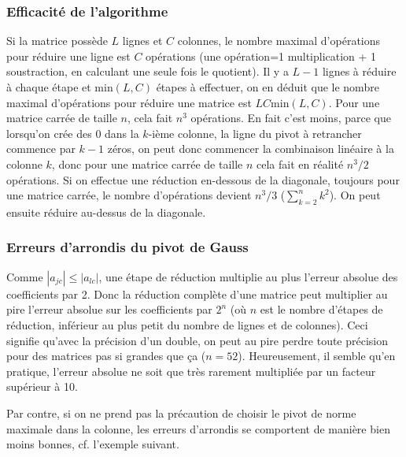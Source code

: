 \documentclass[a4paper,11pt]{article}
\begin{document}
\begin{giacjshere}
\subsubsection{Efficacité de l'algorithme}
Si la matrice possède $L$ lignes et $C$ colonnes,
le nombre maximal d'opérations pour réduire une ligne est 
$C$ op\'erations (une op\'eration=1 multiplication + 1 soustraction, 
en calculant une seule fois le quotient). 
Il y a $L-1$ lignes à réduire à chaque
étape et min$(L,C)$ étapes à effectuer, on en déduit que le
nombre maximal d'opérations pour réduire une matrice est
$LC$min$(L,C)$. Pour une matrice carrée de taille $n$, cela fait 
$n^3$ opérations. En fait c'est moins, parce que lorsqu'on cr\'ee
des 0 dans la $k$-i\`eme colonne, la ligne du pivot \`a retrancher
commence par $k-1$ z\'eros, on peut donc commencer la combinaison lin\'eaire 
\`a la colonne $k$, donc pour une matrice carr\'ee de taille $n$ cela
fait en r\'ealit\'e $n^3/2$ op\'erations.
Si on effectue une r\'eduction en-dessous de la diagonale, 
toujours pour une matrice carr\'ee, le nombre d'op\'erations 
devient $n^3/3$ ($\sum_{k=2}^n k^2$). On peut ensuite r\'eduire au-dessus
de la diagonale.

\subsubsection{Erreurs d'arrondis du pivot de Gauss} 
Comme $|a_{jc}| \leq |a_{lc}|$, une étape de réduction multiplie
au plus l'erreur absolue des coefficients par 2. Donc la
réduction complète d'une matrice peut multiplier au pire l'erreur
absolue sur les coefficients par $2^n$ (où $n$ est le nombre
d'étapes de réduction, inférieur au plus petit du nombre de lignes
et de colonnes). Ceci signifie qu'avec la précision d'un double,
on peut au pire perdre toute précision pour des matrices pas
si grandes que ça ($n=52$). Heureusement, il semble qu'en pratique, 
l'erreur absolue
ne soit que très rarement multipliée par un facteur supérieur à 10.

Par contre, si on ne prend pas la précaution de choisir le pivot
de norme maximale dans la colonne, les erreurs d'arrondis se
comportent de manière bien moins bonnes, cf. l'exemple suivant.


\end{giacjshere}
\end{document}
